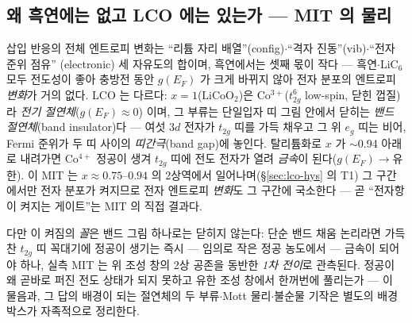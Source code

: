 \subsection{왜 흑연에는 없고 LCO 에는 있는가 --- MIT 의 물리}\label{sec:lco-why}
삽입 반응의 전체 엔트로피 변화는 ``리튬 자리 배열''(config)$\cdot$``격자 진동''(vib)$\cdot$``전자 준위 점유''
(electronic) 세 자유도의 합이며, 흑연에서는 셋째 몫이 작다 --- 흑연$\cdot$$\mathrm{LiC_6}$ 모두 전도성이 좋아
충방전 동안 $g(E_F)$ 가 크게 바뀌지 않아 전자 분포의 엔트로피 \emph{변화}가 거의 없다. LCO 는 다르다:
$x{=}1$($\mathrm{LiCoO_2}$)은 Co$^{3+}$($t_{2g}^6$ low-spin, 닫힌 껍질)라 \emph{전기 절연체}($g(E_F)\!\approx\!0$)
이며, 그 부류는 단일입자 띠 그림 안에서 닫히는 \emph{밴드 절연체}(band insulator)다 --- 여섯 $3d$ 전자가
$t_{2g}$ 띠를 가득 채우고 그 위 $e_g$ 띠는 비어, Fermi 준위가 두 띠 사이의 \emph{띠간극}(band gap)에 놓인다.
탈리튬화로 $x$ 가 $\sim$0.94 아래로 내려가면 Co$^{4+}$ 정공이 생겨 $t_{2g}$ 띠에 전도 전자가 열려
\emph{금속}이 된다($g(E_F)\!\to\!$유한)\cite{menetrier1999,motohashi2009}. 이 MIT 는 $x\approx0.75$--$0.94$ 의
2상역에서 일어나며(\S\ref{sec:lco-hys} 의 T1) 그 구간에서만 전자 분포가 켜지므로 전자 엔트로피 \emph{변화}도
그 구간에 국소한다 --- 곧 ``전자항이 켜지는 게이트''는 MIT 의 직접 결과다.

다만 이 켜짐의 \emph{꼴}은 밴드 그림 하나로는 닫히지 않는다: 단순 밴드 채움 논리라면 가득 찬 $t_{2g}$ 띠
꼭대기에 정공이 생기는 즉시 --- 임의로 작은 정공 농도에서 --- 금속이 되어야 하나, 실측 MIT 는 위 조성 창의
2상 공존을 동반한 \emph{1차 전이}로 관측된다\cite{menetrier1999,reimers1992,motohashi2009}. 정공이 왜 곧바로
퍼진 전도 상태가 되지 못하고 유한 조성 창에서 한꺼번에 풀리는가 --- 이 물음과, 그 답의 배경이 되는 절연체의
두 부류$\cdot$Mott 물리$\cdot$불순물 기작은 별도의 배경 박스가 자족적으로 정리한다.

